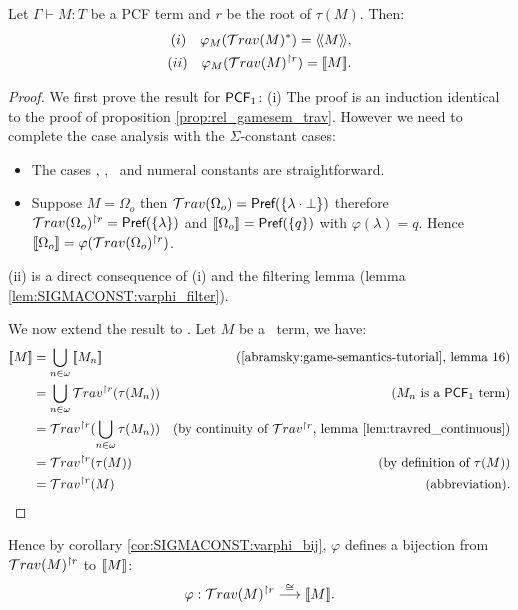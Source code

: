 \begin{prop}
Let $\Gamma \vdash M : T$ be a PCF term and $r$ be the root of
$\tau(M)$. Then:
\begin{align*}
(i)  \quad\varphi_M(\mathcal{T}rav(M)^*) = {\langle\!\langle M \rangle\!\rangle},  \\
(ii) \quad \varphi_M(\mathcal{T}rav(M)^{\upharpoonright r}) = {[\![ M ]\!]}.
\end{align*}
\end{prop}
\begin{proof}
We first prove the result for $\textsf{PCF}_1$: (i) The proof is an
induction identical to the proof of proposition
\ref{prop:rel_gamesem_trav}. However we need to complete the case
analysis with the $\Sigma$-constant cases:
\begin{itemize}
\item The cases \pcfsucc, \pcfpred, \pcfcond\ and numeral constants are straightforward.

\item Suppose $M = \Omega_o$ then $\mathcal{T}rav(\Omega_o) = \textsf{Pref} ( \{ \lambda \cdot \bot \} )$ therefore
$\mathcal{T}rav(\Omega_o)^{\upharpoonright r} = \textsf{Pref}( \{ \lambda \} )$
and ${[\![ \Omega_o ]\!]} = \textsf{Pref}( \{ q \})$ with $\varphi(\lambda) =
q$. Hence ${[\![ \Omega_o ]\!]} = \varphi
(\mathcal{T}rav(\Omega_o)^{\upharpoonright r})$.
\end{itemize}
(ii) is a direct consequence of (i) and the filtering lemma (lemma
\ref{lem:SIGMACONST:varphi_filter}). \vspace{10pt}

\noindent We now extend the result to \pcf. Let $M$ be a \pcf\ term,
we have:
\begin{align*}
{[\![M ]\!]} &= \bigcup_{n\in\omega} {[\![ M_n ]\!]} & (\mbox{\cite{abramsky:game-semantics-tutorial}, lemma 16})\\
&= \bigcup_{n\in\omega} \mathcal{T}rav^{\upharpoonright r}(\tau(M_n)) & (M_n \mbox{ is a $\textsf{PCF}_1$ term}) \\
&= \mathcal{T}rav^{\upharpoonright r}(\bigcup_{n\in\omega} \tau(M_n) ) & (\mbox{by continuity of $\mathcal{T}rav^{\upharpoonright r}$, lemma \ref{lem:travred_continuous}}) \\
&= \mathcal{T}rav^{\upharpoonright r}(\tau(M)) & (\mbox{by definition of } \tau(M)) \\
&= \mathcal{T}rav^{\upharpoonright r}(M) & (\mbox{abbreviation}).
\end{align*}
\end{proof}

Hence by corollary \ref{cor:SIGMACONST:varphi_bij}, $\varphi$
defines a bijection from $\mathcal{T}rav(M)^{\upharpoonright r}$ to
${[\![ M ]\!]}$:
$$\varphi : \mathcal{T}rav(M)^{\upharpoonright r} \stackrel{\cong}{\longrightarrow} {[\![ M ]\!]}.$$

